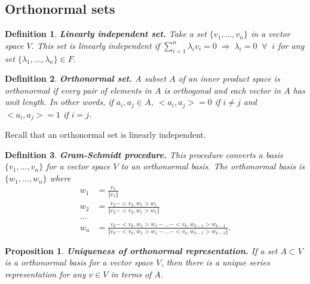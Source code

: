 \documentclass[two column]{article}
\newtheorem{proposition}[theorem]{Proposition}
\newtheorem{definition}{Definition}[subsection]
\begin{document}
\subsection{Orthonormal sets}

\begin{definition}
{\bf Linearly independent set.} Take a set $\{v_{1}, \dots, v_{n} \}$ in a vector space $V$. This set is linearly independent if $\sum_{i=1}^{n} \lambda_{i} v_{i} = 0 \; \Rightarrow \; \lambda_{i} = 0 \;\; \forall \;\; i$ for any set $\{ \lambda_{1}, \dots, \lambda_{n} \} \in F$. \\
\end{definition}

\begin{definition}
{\bf Orthonormal set.} A subset $A$ of an inner product space is orthonormal if every pair of elements in $A$ is orthogonal and each vector in $A$ has unit length. In other words, if $a_{i},a_{j} \in A$, $< a_{i},a_{j} > = 0$ if $i \neq j$ and $< a_{i},a_{j} > = 1$ if $i = j$. \\
\end{definition}

Recall that an orthonormal set is linearly independent. \\

\begin{definition}
{\bf Gram-Schmidt procedure.} This procedure converts a basis $\{v_{1}, \dots, v_{n} \}$ for a vector space $V$ to an orthonormal basis. The orthonormal basis is $\{w_{1}, \dots, w_{n} \}$ where \vspace{-5pt}
\begin{align*}
w_{1} &= \frac{v_{1}}{\Vert v_{1} \Vert} \\
w_{2} &= \frac{v_{2} - <v_{2},w_{1}>w_{1}}{\Vert v_{2} - <v_{2},w_{1}>w_{1} \Vert} \\
\dots \\
w_{n} &= \frac{v_{k} - <v_{k},w_{1}>w_{1} - \dots - <v_{k},w_{k-1}>w_{k-1}}{\Vert v_{k} - <v_{k},w_{1}>w_{1} - \dots - <v_{k},w_{k-1}>w_{k-1} \Vert}. 
\end{align*} 
\end{definition} \vspace{5pt}

\begin{proposition}
{\bf Uniqueness of orthonormal representation.} If a set $A \subset V$ is a orthonormal basis for a vector space $V$, then there is a unique series representation for any $v \in V$ in terms of $A$. 
\end{proposition}
\end{document}
